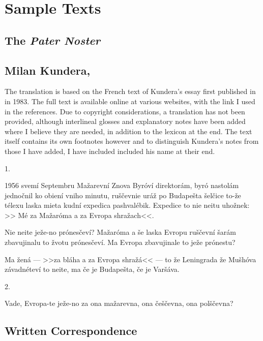 \chapter{Sample Texts}

\section{The \emph{Pater Noster}}

\section{Milan Kundera, }

{\small
The translation is based on the French text of Kundera's essay  first published in  in 1983. The full text is available online at various websites, with the link I used in the references. Due to copyright considerations, a translation has not been provided, although interlineal glosses and explanatory notes have been added where  I believe they are needed, in addition to the lexicon at the end. The text itself contains its own footnotes however and to distinguish Kundera's notes from those I have added, I have included included his name at their end.
}

\begin{center}1.\end{center}

1956 svemí Septembru Mažarevní Znova Byróví direktorám, byró
nastolám jednočnil ko obiení vniho minutu, ruščevnie uráž
po Budapešta šelčice to-že télexu laska mieta kudní expedica
pashvalébik. Expedice to nie neitu uhožnek: >> Mé za Mažaróma a
za Evropa shražach<<.

Nie neite ježe-no prónesčeví? Mažaróma a še laska Evropu ruščevní šarám zbavujinalu to žvotu prónesčeví. Ma Evropa zbavujinale to ježe prónestu?

Ma žená --- >>za bláha a za Evropa shražá<< --- to že Leningrada že Mušhóva závadnéteví to neite, ma če je Budapešta, če je Varšáva.

\begin{center}2.\end{center}
Vade, Evropa-te ježe-no za ona mažarevna, ona češčevna, ona polščevna?


\section{Written Correspondence}\label{sec:writcorr}

